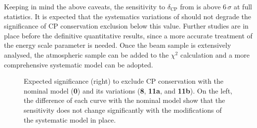 Keeping in mind the above caveats, the sensitivity to $\delta_\text{CP}$ from  %
is above $6\,\sigma$ at full statistics.
It is expected that the systematics variations of  should not degrade %
the significance of CP conservation exclusion below this value.
Further studies are in place before the definitive quantitative results, %
since a more accurate treatment of the energy scale parameter is needed.
Once the beam sample is extensively analysed, the atmospheric sample can be added to the $\chi^2$ calculation %
and a more comprehensive systematic model can be adopted. 

\begin{figure}
	\centering
	\resizebox{0.49\linewidth}{!}{}
	\resizebox{0.49\linewidth}{!}{}
	\caption[Sensitivity to $\delta_\text{CP} = 0$ with variations on the nominal systematic model]%
		{Expected significance (right) to exclude CP conservation with the nominal model (\textbf{0}) %
		and its variations (\textbf{8}, \textbf{11a}, and \textbf{11b}).
		On the left, the difference of each curve with the nominal model show that the sensitivity %
		does not change significantly with the modifications of the systematic model in place.}
	\label{fig:0_11a_11b_8_sensitivity}
\end{figure}

